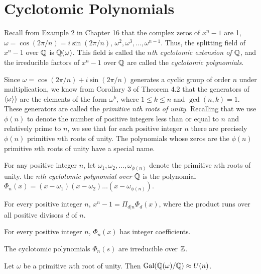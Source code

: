 \section{Cyclotomic Polynomials}

\begin{remark}
	Recall from Example 2 in Chapter 16 that the complex zeros of $x^n-1$ are 1, $\omega = \cos(2\pi/n) = i\sin(2\pi/n)$, $\omega^2, \omega^3,\dots,\omega^{n-1}$. Thus, the splitting field of $x^n-1$ over $\mathbb{Q}$ is $\mathbb{Q}(\omega)$. This field is called the \textit{$n$th cyclotomic extension of $\mathbb{Q}$}, and the irreducible factors of $x^n-1$ over $\mathbb{Q}$ are called the \textit{cyclotomic polynomials}.

	Since $\omega=\cos(2\pi/n) + i\sin(2\pi/n)$ generates a cyclic group of order $n$ under multiplication, we know from Corollary 3 of Theorem 4.2 that the generators of $\langle \omega \rangle)$ are the elements of the form $\omega^k$, where $1 \leq k \leq n$ and $\gcd(n,k) = 1$. These generators are called the \textit{primitive $n$th roots of unity}. Recalling that we use $\phi(n)$ to denote the number of positive integers less than or equal to $n$ and relatively prime to $n$, we see that for each positive integer $n$ there are precisely $\phi(n)$ primitive $n$th roots of unity. The polynomials whose zeros are the $\phi(n)$ primitive $n$th roots of unity have a special name.
\end{remark}

\begin{definition}
	For any positive integer $n$, let $\omega_1,\omega_2,\dots,\omega_{\phi(n)}$ denote the primitive $n$th roots of unity. the \textit{$n$th cyclotomic polynomial over $\mathbb{Q}$} is the polynomial $\Phi_n(x) = (x-\omega_1)(x-\omega_2)\dots(x-\omega_{\phi(n)})$.
\end{definition}

\begin{theorem}
	For every positive integer $n$, $x^n-1 = \Pi_{d\vert n}\Phi_d(x)$, where the product runs over all positive divisors $d$ of $n$.
\end{theorem}

\begin{theorem}
	For every positive integer $n$, $\Phi_n(x)$ has integer coefficients.
\end{theorem}

\begin{theorem}[(Gauss)]
	The cyclotomic polynomials $\Phi_n(s)$ are irreducible over $\mathbb{Z}$.
\end{theorem}

\begin{theorem}
	Let $\omega$ be a primitive $n$th root of unity. Then $\text{Gal}(\mathbb{Q}(\omega)/\mathbb{Q}) \approx U(n)$.
\end{theorem}
